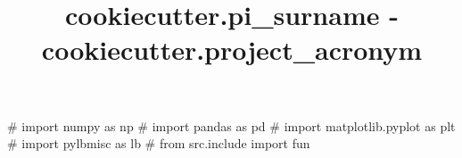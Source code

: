 \documentclass{article}
\begin{document}
\title{ {{cookiecutter.pi_surname}} - {{cookiecutter.project_acronym}} }
\maketitle
\tableofcontents

\begin{pycode}
# import numpy as np
# import pandas as pd
# import matplotlib.pyplot as plt
# import pylbmisc as lb
# from src.include import fun
\end{pycode}




\printbibliography 
\end{document}
